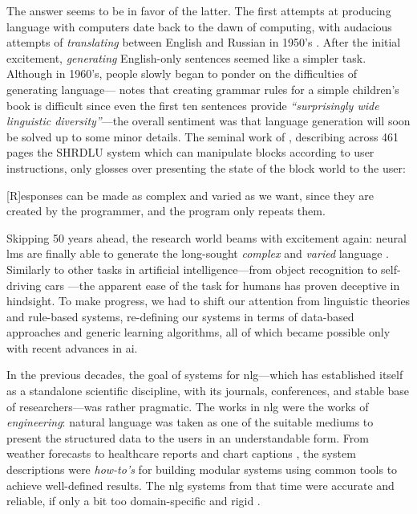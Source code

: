 \documentclass[12pt,notitlepage,a4paper,openright]{report}
\begin{document}
The answer seems to be in favor of the latter. The first attempts at producing language with computers date back to the dawn of computing, with audacious attempts of \textit{translating} between English and Russian in 1950's \cite{sheridan1955research}. After the initial excitement, \textit{generating} English-only sentences seemed like a simpler task. Although in 1960's, people slowly began to ponder on the difficulties of generating language---\citet{yngve1961random} notes that creating grammar rules for a simple children's book is difficult since even the first ten sentences provide \textit{``surprisingly wide linguistic diversity''}---the overall sentiment was that language generation will soon be solved up to some minor details. The seminal work of \citet{winograd1971procedures}, describing  across 461 pages the SHRDLU system which can manipulate blocks according to user instructions, only glosses over presenting the state of the block world to the user:
\begin{pquotation}{\citealp[p.384]{winograd1971procedures}}
  [R]esponses can be made as complex and varied as we want, since they are created by the programmer, and the program only repeats them.
\end{pquotation}
Skipping 50 years ahead, the research world beams with excitement again: neural \acp{lm} are finally able to generate the long-sought \textit{complex} and \textit{varied} language \cite{vaswani2017attention,radford2019language,brown2020language}. Similarly to other tasks in artificial intelligence---from object recognition \cite{papert1966summer} to self-driving cars \cite{autonomouscars}---the apparent ease of the task for humans has proven deceptive in hindsight. To make progress, we had to shift our attention from linguistic theories and rule-based systems, re-defining our systems in terms of data-based approaches and generic learning algorithms, all of which became possible only with recent advances in \ac{ai}.

In the previous decades, the goal of systems for \ac{nlg}---which has established itself as a standalone scientific discipline, with its journals, conferences, and stable base of researchers---was rather pragmatic.
The works in \ac{nlg} were the works of \textit{engineering}: natural language was  taken as one of the suitable mediums to present the structured data to the users in an understandable form. From weather forecasts \cite{belzAutomaticGenerationWeather2008} to healthcare reports \cite{portetAutomaticGenerationTextual2009} and chart captions \cite{demirSummarizingInformationGraphics2012}, the system descriptions were \textit{how-to's} for building modular systems using common tools to achieve well-defined results.
The \ac{nlg} systems from that time were accurate and reliable, if only a bit too domain-specific and rigid \cite{reiterBuildingAppliedNatural1997,gattSurveyStateArt2018}.
\end{document}
